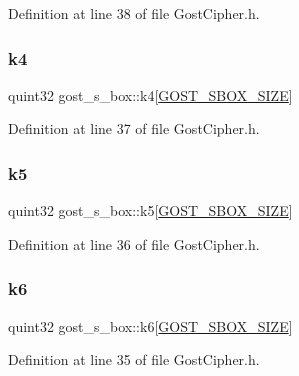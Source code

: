 Definition at line 38 of file Gost\+Cipher.\+h.

\mbox{\label{structgost__s__box_a65e5654482ffb03ba835b7953e71d395}} 
\subsubsection{\texorpdfstring{k4}{k4}}
{\footnotesize\ttfamily quint32 gost\+\_\+s\+\_\+box\+::k4\mbox{[}\hyperlink{_gost_cipher_8h_aa62d143b3b91c5333e7835aaf1c3b2de}{G\+O\+S\+T\+\_\+\+S\+B\+O\+X\+\_\+\+S\+I\+ZE}\mbox{]}}



Definition at line 37 of file Gost\+Cipher.\+h.

\mbox{\label{structgost__s__box_a43d62025a331257c4c36d7e939ce5a7c}} 
\subsubsection{\texorpdfstring{k5}{k5}}
{\footnotesize\ttfamily quint32 gost\+\_\+s\+\_\+box\+::k5\mbox{[}\hyperlink{_gost_cipher_8h_aa62d143b3b91c5333e7835aaf1c3b2de}{G\+O\+S\+T\+\_\+\+S\+B\+O\+X\+\_\+\+S\+I\+ZE}\mbox{]}}



Definition at line 36 of file Gost\+Cipher.\+h.

\mbox{\label{structgost__s__box_a80070ee6ff40dc8ebd0d50abcb805369}} 
\subsubsection{\texorpdfstring{k6}{k6}}
{\footnotesize\ttfamily quint32 gost\+\_\+s\+\_\+box\+::k6\mbox{[}\hyperlink{_gost_cipher_8h_aa62d143b3b91c5333e7835aaf1c3b2de}{G\+O\+S\+T\+\_\+\+S\+B\+O\+X\+\_\+\+S\+I\+ZE}\mbox{]}}



Definition at line 35 of file Gost\+Cipher.\+h.

\mbox{\label{structgost__s__box_afab1bdca9bccc878fd8ca5087df305b4}} 
